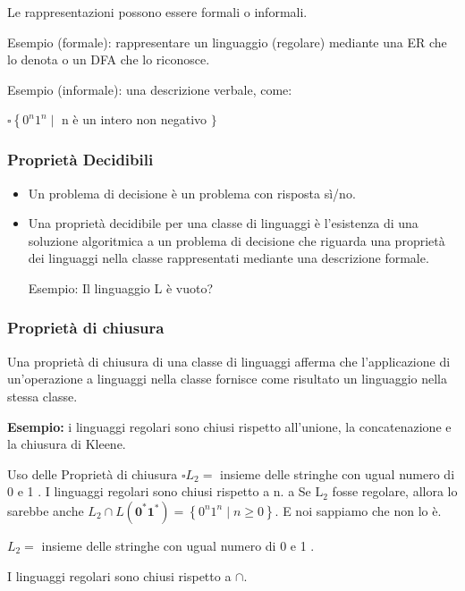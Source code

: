 Le rappresentazioni possono essere formali o
informali.

Esempio (formale): rappresentare un
linguaggio (regolare) mediante una ER che
lo denota o un DFA che lo riconosce.

Esempio (informale): una descrizione
verbale, come:

$\square\left\{0^{n} 1^{n} \mid\right.$ n è un intero non negativo $\}$

\subsubsection{Proprietà Decidibili}



\begin{itemize}
    \item Un problema di decisione è un problema
con risposta sì/no.
    \item Una proprietà decidibile per una classe di
linguaggi è l’esistenza di una soluzione
algoritmica a un problema di decisione
che riguarda una proprietà dei linguaggi
nella classe rappresentati mediante una
descrizione formale.

Esempio: Il linguaggio L è vuoto?
\end{itemize}

\subsubsection{Proprietà di chiusura}

Una proprietà di chiusura di una classe
di linguaggi afferma che l’applicazione
di un’operazione a linguaggi nella classe
fornisce come risultato un linguaggio
nella stessa classe.

\textbf{Esempio:} i linguaggi regolari sono chiusi
rispetto all’unione, la concatenazione e
la chiusura di Kleene.


Uso delle Proprietà di chiusura $\square L_{2}=$ insieme delle stringhe con ugual numero di 0 e 1 .
I linguaggi regolari sono chiusi rispetto a n.
a Se $\mathrm{L}_{2}$ fosse regolare, allora lo sarebbe anche $L_{2} \cap L\left(\mathbf{0}^{*} \mathbf{1}^{*}\right)=\left\{0^{n} 1^{n} \mid n \geq 0\right\}$. E noi sappiamo che non lo è.

\vspace{5mm}

$L_{2}=$ insieme delle stringhe con ugual numero di 0 e 1 .

I linguaggi regolari sono chiusi rispetto a $\cap$.

